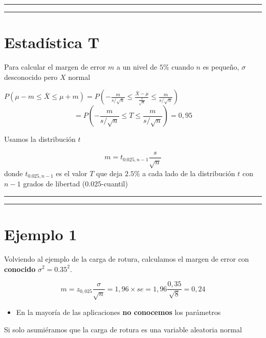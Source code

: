 \documentclass[
]{book}
\providecommand{\tightlist}{%
  \setlength{\itemsep}{0pt}\setlength{\parskip}{0pt}}
\begin{document}
\begin{center}\rule{0.5\linewidth}{0.5pt}\end{center}

\begin{center}\rule{0.5\linewidth}{0.5pt}\end{center}

\hypertarget{estaduxedstica-t-2}{%
\section{Estadística T}\label{estaduxedstica-t-2}}

Para calcular el margen de error \(m\) a un nivel de \(5\%\) cuando \(n\) es pequeño, \(\sigma\) desconocido pero \(X\) normal

\(P(\mu-m \leq \bar{X} \leq\mu + m)=P(-\frac{m}{s/\sqrt{n}} \leq \frac{\bar{X}- \mu}{\frac{s}{\sqrt{n}}} \leq\frac{m}{s/\sqrt{n}})\)
\[=P(-\frac{m}{s/\sqrt{n}} \leq T \leq\frac{m}{s/\sqrt{n}})=0,95\]

Usamos la distribución \(t\)

\[m=t_{0.025, n-1} \frac{s}{\sqrt{n}}\]
donde \(t_{0.025, n-1}\) es el valor \(T\) que deja \(2.5\%\) a cada lado de la distribución \(t\) con \(n-1\) grados de libertad (\(0.025\)-cuantil)

\begin{center}\rule{0.5\linewidth}{0.5pt}\end{center}

\begin{center}\rule{0.5\linewidth}{0.5pt}\end{center}

\hypertarget{ejemplo-1-3}{%
\section{Ejemplo 1}\label{ejemplo-1-3}}

Volviendo al ejemplo de la carga de rotura, calculamos el margen de error con \textbf{conocido} \(\sigma^2=0.35^2\).

\[m=z_{0,025} \frac{\sigma}{\sqrt{n}}=1,96\times se=1,96\frac{0,35}{\sqrt{8}}=0,24\]

\begin{itemize}
\tightlist
\item
  En la mayoría de las aplicaciones \textbf{no conocemos} los parámetros
\end{itemize}

Si solo asumiéramos que la carga de rotura es una variable aleatoria normal
\end{document}

